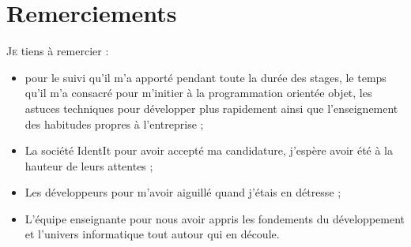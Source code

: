 \chapter*{Remerciements} %
\label{cha:Remerciements}

\lettrine{J}{e} tiens à remercier :
\begin{itemize}
    \item {} pour le suivi qu'il m'a apporté pendant toute la
    durée des stages, le temps qu'il m'a consacré pour m'initier à la
    programmation orientée objet, les astuces techniques pour développer
    plus rapidement ainsi que l'enseignement des habitudes propres à
    l'entreprise ;
    \item La société IdentIt pour avoir accepté ma candidature, j'espère avoir
    été à la hauteur de leurs attentes ;
    \item Les développeurs pour m'avoir aiguillé quand j'étais en détresse ;
    \item L'équipe enseignante pour nous avoir appris les fondements du
    développement et l'univers informatique tout autour qui en découle.
\end{itemize}
